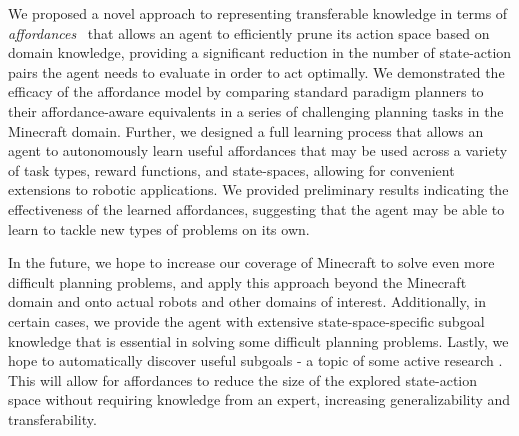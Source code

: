 \documentclass[letterpaper]{article}
\begin{document}
We proposed a novel approach to representing transferable knowledge in terms of
{\em affordances}~\cite{gibson77} that allows an agent to efficiently
prune its action space based on domain knowledge,
providing a significant reduction in the number of state-action pairs the
agent needs to evaluate in order to act optimally. We demonstrated the efficacy of the affordance model by comparing standard paradigm
planners to their affordance-aware equivalents in a series of challenging planning tasks in the Minecraft
domain. Further, we designed a full learning process that allows an agent to autonomously learn useful affordances that may be used
across a variety of task types, reward functions, and state-spaces, allowing for convenient extensions to robotic applications.
We provided preliminary results indicating the effectiveness of the learned affordances, suggesting that
the agent may be able to learn to tackle new types of problems on its own.

In the future, we hope to increase our coverage of Minecraft to solve even more difficult planning problems, and apply this
approach beyond the Minecraft domain and onto actual robots and other domains of interest. Additionally, in certain cases, we provide
the agent with extensive state-space-specific subgoal knowledge that is essential in solving some difficult planning problems. Lastly,
we hope to automatically discover useful subgoals - a topic of some active research \cite{Mcgovern01automaticdiscovery, Simsek:2005:IUS:1102351.1102454}. This will allow for affordances to reduce the size of the explored state-action space without requiring knowledge from an expert, increasing generalizability and transferability.



\end{document}
